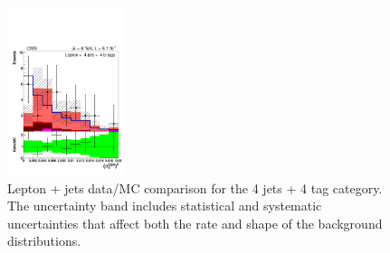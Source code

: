 \begin{figure}[hbtp]
\begin{center}
   \includegraphics[width=0.31\textwidth]{Figures/Analysis_1_Diagrams/d2MCPlots_dev_from_avg_disc_btags_cut7_j4_t4_Combined_HtWgt.pdf}
   \hspace{0.055\textwidth}
   \caption{Lepton + jets data/MC comparison for the 4 jets + 4 tag category.  The uncertainty band includes statistical and systematic uncertainties that affect both the rate and shape of the background distributions.}
   \label{fig:lj_input_4j_4t_part1}
 \end{center}
\end{figure}

\clearpage

